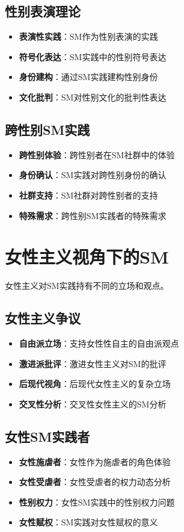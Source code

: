 \documentclass[12pt,UTF8]{ctexbook}
\begin{document}
\subsection{性别表演理论}
\begin{itemize}[leftmargin=2cm]
	\item \textbf{表演性实践}：SM作为性别表演的实践
	\item \textbf{符号化表达}：SM实践中的性别符号表达
	\item \textbf{身份建构}：通过SM实践建构性别身份
	\item \textbf{文化批判}：SM对性别文化的批判性表达
\end{itemize}

\subsection{跨性别SM实践}
\begin{itemize}[leftmargin=2cm]
	\item \textbf{跨性别体验}：跨性别者在SM社群中的体验
	\item \textbf{身份确认}：SM实践对跨性别身份的确认
	\item \textbf{社群支持}：SM社群对跨性别者的支持
	\item \textbf{特殊需求}：跨性别SM实践者的特殊需求
\end{itemize}

\section{女性主义视角下的SM}
女性主义对SM实践持有不同的立场和观点。

\subsection{女性主义争议}
\begin{itemize}[leftmargin=2cm]
	\item \textbf{自由派立场}：支持女性性自主的自由派观点
	\item \textbf{激进派批评}：激进女性主义对SM的批评
	\item \textbf{后现代视角}：后现代女性主义的复杂立场
	\item \textbf{交叉性分析}：交叉性女性主义的SM分析
\end{itemize}

\subsection{女性SM实践者}
\begin{itemize}[leftmargin=2cm]
	\item \textbf{女性施虐者}：女性作为施虐者的角色体验
	\item \textbf{女性受虐者}：女性受虐者的权力动态分析
	\item \textbf{性别权力}：女性SM实践中的性别权力问题
	\item \textbf{女性赋权}：SM实践对女性赋权的意义
\end{itemize}
\end{document}
